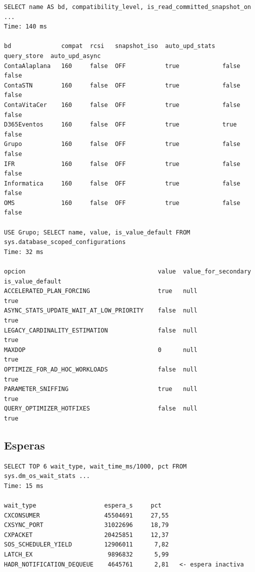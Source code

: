 \documentclass[11pt,a4paper]{article}
\begin{document}
\begin{lstlisting}[style=salida]
SELECT name AS bd, compatibility_level, is_read_committed_snapshot_on ...
Time: 140 ms

bd              compat  rcsi   snapshot_iso  auto_upd_stats  query_store  auto_upd_async
ContaAlaplana   160     false  OFF           true            false        false
ContaSTN        160     false  OFF           true            false        false
ContaVitaCer    160     false  OFF           true            false        false
D365Eventos     160     false  OFF           true            true         false
Grupo           160     false  OFF           true            false        false
IFR             160     false  OFF           true            false        false
Informatica     160     false  OFF           true            false        false
OMS             160     false  OFF           true            false        false

USE Grupo; SELECT name, value, is_value_default FROM sys.database_scoped_configurations
Time: 32 ms

opcion                                     value  value_for_secondary  is_value_default
ACCELERATED_PLAN_FORCING                   true   null                 true
ASYNC_STATS_UPDATE_WAIT_AT_LOW_PRIORITY    false  null                 true
LEGACY_CARDINALITY_ESTIMATION              false  null                 true
MAXDOP                                     0      null                 true
OPTIMIZE_FOR_AD_HOC_WORKLOADS              false  null                 true
PARAMETER_SNIFFING                         true   null                 true
QUERY_OPTIMIZER_HOTFIXES                   false  null                 true
\end{lstlisting}

\subsection{Esperas}

\begin{lstlisting}[style=salida]
SELECT TOP 6 wait_type, wait_time_ms/1000, pct FROM sys.dm_os_wait_stats ...
Time: 15 ms

wait_type                   espera_s     pct
CXCONSUMER                  45504691     27,55
CXSYNC_PORT                 31022696     18,79
CXPACKET                    20425851     12,37
SOS_SCHEDULER_YIELD         12906011      7,82
LATCH_EX                     9896832      5,99
HADR_NOTIFICATION_DEQUEUE    4645761      2,81   <- espera inactiva
\end{lstlisting}
\end{document}
